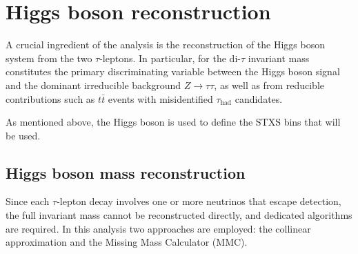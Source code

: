 \section{Higgs boson reconstruction}
\label{sec:higgs_reconstruction}

A crucial ingredient of the \htautau analysis is the reconstruction of the Higgs boson system from the two $\tau$-leptons. In particular, for \ttHtt the di-$\tau$ invariant mass constitutes the primary discriminating variable between the Higgs boson signal and the dominant irreducible background $Z\to\tau\tau$, as well as from reducible contributions such as $t\bar{t}$ events with misidentified $\tau_{\text{had}}$ candidates. 

As mentioned above, the Higgs boson \pt is used to define the \ttH STXS bins that will be used.

\subsection{Higgs boson mass reconstruction}
\label{subsec:higgs_pt}

Since each $\tau$-lepton decay involves one or more neutrinos that escape detection, the full invariant mass cannot be reconstructed directly, and dedicated algorithms are required. In this analysis two approaches are employed: the collinear approximation and the Missing Mass Calculator (MMC).  

